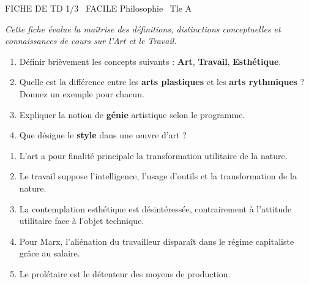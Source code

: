 \documentclass[11pt]{article}
\begin{document}
\begin{tcolorbox}[enhanced,colback=popink,colframe=popink,arc=10pt,boxrule=0pt,left=12pt,right=12pt,top=9pt,bottom=9pt]
{\color{white}\popxbold\small FICHE DE TD 1/3 \textbullet\ FACILE \hfill Philosophie \textbullet\ Tle A\par}
\end{tcolorbox}
\vspace{4pt}
\noindent \textit{Cette fiche évalue la maîtrise des définitions, distinctions conceptuelles et connaissances de cours sur l'Art et le Travail.}

\begin{exercice}
\begin{enumerate}
    \item Définir brièvement les concepts suivants : \textbf{Art}, \textbf{Travail}, \textbf{Esthétique}.
    \item Quelle est la différence entre les \textbf{arts plastiques} et les \textbf{arts rythmiques} ? Donnez un exemple pour chacun.
    \item Expliquer la notion de \textbf{génie} artistique selon le programme.
    \item Que désigne le \textbf{style} dans une œuvre d'art ?
\end{enumerate}
\end{exercice}

\begin{exercice}
\begin{enumerate}
    \item L'art a pour finalité principale la transformation utilitaire de la nature.
    \item Le travail suppose l'intelligence, l'usage d'outils et la transformation de la nature.
    \item La contemplation esthétique est désintéressée, contrairement à l'attitude utilitaire face à l'objet technique.
    \item Pour Marx, l'aliénation du travailleur disparaît dans le régime capitaliste grâce au salaire.
    \item Le prolétaire est le détenteur des moyens de production.
\end{enumerate}
\end{exercice}
\end{document}
